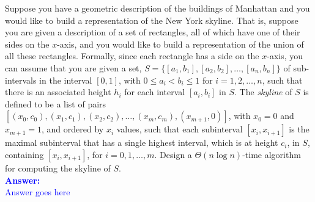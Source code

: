 \item{}
Suppose you have a geometric description of the buildings of Manhattan and you
would like to build a representation of the New York skyline. That is, suppose
you are given a description of a set of rectangles, all of which have one of
their sides on the $x$-axis, and you would like to build a representation of the
union of all these rectangles. Formally, since each rectangle has a side on the
$x$-axis, you can assume that you are given a set, $S=\lbrace[a_1,b_1],[a_2,
b_2],\ldots,[a_n,b_n]\rbrace$ of sub-intervals in the interval $[0,1]$, with
$0\le a_i<b_i\le1$ for $i=1,2,\ldots,n$, such that there is an associated height
$h_i$ for each interval $[a_i,b_i]$ in $S$. The \emph{skyline} of $S$ is defined
to be a list of pairs $[(x_0,c_0),(x_1,c_1),(x_2,c_2),\ldots,(x_m,c_m),(x_{m+1},
0)]$, with $x_0=0$ and $x_{m+1}=1$, and ordered by $x_i$ values, such that each
subinterval $[x_i,x_{i+1}]$ is the maximal subinterval that has a single highest
interval, which is at height $c_i$, in $S$, containing $[x_i,x_{i+1}]$, for
$i=0,1,\ldots,m$. Design a $\Theta(n\log n)$-time algorithm for computing the
skyline of $S$.\\[12pt]
\ifanswers
\textcolor{blue}{
\textbf{Answer:}\\[6pt]
Answer goes here
}
\newpage
\fi
